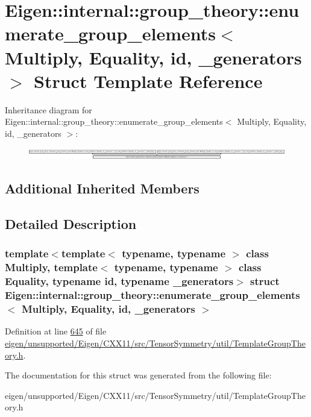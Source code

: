 \hypertarget{struct_eigen_1_1internal_1_1group__theory_1_1enumerate__group__elements}{}\section{Eigen\+:\+:internal\+:\+:group\+\_\+theory\+:\+:enumerate\+\_\+group\+\_\+elements$<$ Multiply, Equality, id, \+\_\+generators $>$ Struct Template Reference}
\label{struct_eigen_1_1internal_1_1group__theory_1_1enumerate__group__elements}
Inheritance diagram for Eigen\+:\+:internal\+:\+:group\+\_\+theory\+:\+:enumerate\+\_\+group\+\_\+elements$<$ Multiply, Equality, id, \+\_\+generators $>$\+:\begin{figure}[H]
\begin{center}
\leavevmode
\includegraphics[height=0.498221cm]{struct_eigen_1_1internal_1_1group__theory_1_1enumerate__group__elements}
\end{center}
\end{figure}
\subsection*{Additional Inherited Members}


\subsection{Detailed Description}
\subsubsection*{template$<$template$<$ typename, typename $>$ class Multiply, template$<$ typename, typename $>$ class Equality, typename id, typename \+\_\+generators$>$\newline
struct Eigen\+::internal\+::group\+\_\+theory\+::enumerate\+\_\+group\+\_\+elements$<$ Multiply, Equality, id, \+\_\+generators $>$}



Definition at line \hyperlink{eigen_2unsupported_2_eigen_2_c_x_x11_2src_2_tensor_symmetry_2util_2_template_group_theory_8h_source_l00645}{645} of file \hyperlink{eigen_2unsupported_2_eigen_2_c_x_x11_2src_2_tensor_symmetry_2util_2_template_group_theory_8h_source}{eigen/unsupported/\+Eigen/\+C\+X\+X11/src/\+Tensor\+Symmetry/util/\+Template\+Group\+Theory.\+h}.



The documentation for this struct was generated from the following file\+:\begin{DoxyCompactItemize}
\item 
eigen/unsupported/\+Eigen/\+C\+X\+X11/src/\+Tensor\+Symmetry/util/\+Template\+Group\+Theory.\+h\end{DoxyCompactItemize}
